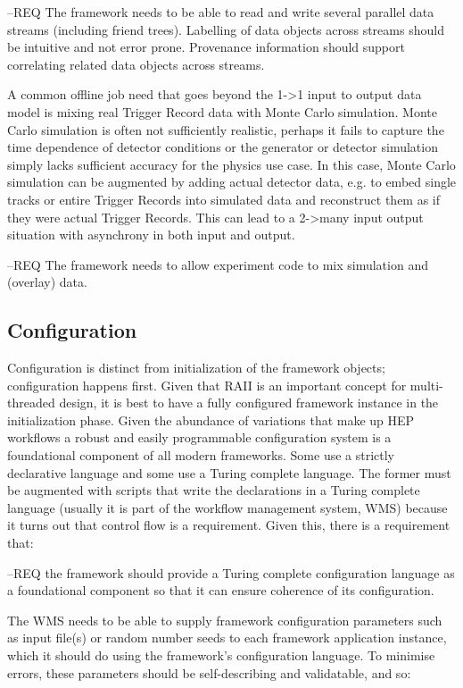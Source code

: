 \documentclass[../main-v1.tex]{subfiles}
\begin{document}
--REQ The framework needs to be able to read and write several parallel data streams (including friend trees).  Labelling of data objects across streams should be intuitive and not error prone.  Provenance information should support correlating related data objects across streams.

A common offline job need that goes beyond the 1->1 input to output data model is mixing real Trigger Record data with Monte Carlo simulation.  Monte Carlo simulation is often not sufficiently realistic, perhaps it fails to capture the time dependence of detector conditions or the generator or detector simulation simply lacks sufficient accuracy for the physics use case.  In this case, Monte Carlo simulation can be augmented by adding actual detector data, e.g. to embed single tracks or entire Trigger Records into simulated data and reconstruct them as if they were actual Trigger Records.  This can lead to a 2->many input output situation with asynchrony in both input and output. 

--REQ The framework needs to allow experiment code to mix simulation and (overlay) data.


\subsection{Configuration}

Configuration is distinct from initialization of the framework objects; configuration happens first.  Given that RAII is an important concept for multi-threaded design, it is best to have a fully configured framework instance in the initialization phase.  Given the abundance of variations that make up HEP workflows a robust and easily programmable configuration system is a foundational component of all modern frameworks.  Some use a strictly declarative language and some use a Turing complete language.  The former must be augmented with scripts that write the declarations in a Turing complete language (usually it is part of the workflow management system, WMS) because it turns out that control flow is a requirement.  Given this, there is a requirement that:


--REQ the framework should provide a Turing complete configuration language as a foundational component so that it can ensure coherence of its configuration.

The WMS needs to be able to supply framework configuration parameters such as input file(s) or random number seeds to each framework application instance, which it should do using the framework’s configuration language.  To minimise errors, these parameters should be self-describing and validatable, and so:
\end{document}

